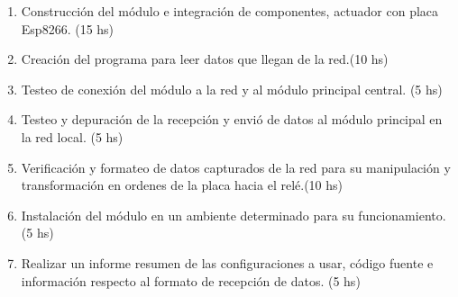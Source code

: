 \documentclass[11pt]{charter}
\begin{document}
\begin{enumerate}
	\begin{enumerate}
	\item Construcción del módulo e integración de componentes, actuador con placa Esp8266. (15 hs)
	\item Creación del programa para leer datos que llegan de la red.(10 hs)
	\item Testeo de conexión del módulo a la red y al módulo principal central. (5 hs)
	\item Testeo y depuración de la recepción y envió de datos al módulo principal en la red local. (5 hs)
	\item Verificación y formateo de datos capturados de la red para su manipulación y transformación en ordenes de la placa hacia el relé.(10 hs)
	\item Instalación del módulo en un ambiente determinado para su funcionamiento. (5 hs)
	\item Realizar un informe resumen de las configuraciones a usar, código fuente e información respecto al formato de recepción de datos. (5 hs)
	\end{enumerate}
	

\end{enumerate}
\end{document}
